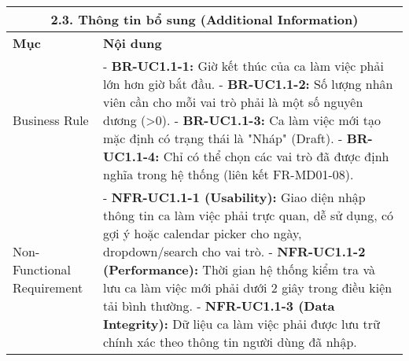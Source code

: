 \begin{longtable}{|m{4cm}|p{11cm}|}
\hline
\multicolumn{2}{|c|}{\textbf{2.3. Thông tin bổ sung (Additional Information)}} \\
\hline
\textbf{Mục} & \textbf{Nội dung} \\
\hline
Business Rule & - \textbf{BR-UC1.1-1:} Giờ kết thúc của ca làm việc phải lớn hơn giờ bắt đầu. \newline - \textbf{BR-UC1.1-2:} Số lượng nhân viên cần cho mỗi vai trò phải là một số nguyên dương (>0). \newline - \textbf{BR-UC1.1-3:} Ca làm việc mới tạo mặc định có trạng thái là "Nháp" (Draft). \newline - \textbf{BR-UC1.1-4:} Chỉ có thể chọn các vai trò đã được định nghĩa trong hệ thống (liên kết FR-MD01-08). \\
\hline
Non-Functional Requirement & - \textbf{NFR-UC1.1-1 (Usability):} Giao diện nhập thông tin ca làm việc phải trực quan, dễ sử dụng, có gợi ý hoặc calendar picker cho ngày, dropdown/search cho vai trò. \newline - \textbf{NFR-UC1.1-2 (Performance):} Thời gian hệ thống kiểm tra và lưu ca làm việc mới phải dưới 2 giây trong điều kiện tải bình thường. \newline - \textbf{NFR-UC1.1-3 (Data Integrity):} Dữ liệu ca làm việc phải được lưu trữ chính xác theo thông tin người dùng đã nhập. \\
\hline

\end{longtable}

